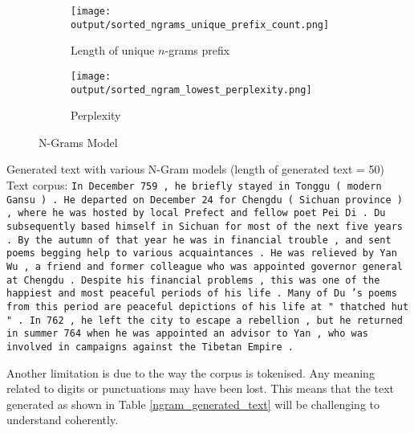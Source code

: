 \begin{figure}[h!]
    \centering
    
    \begin{subfigure}[b]{0.45\textwidth}
        \centering
        \texttt{[image: output/sorted\_ngrams\_unique\_prefix\_count.png]}
        \caption{Length of unique $n$-grams prefix}
        \label{fig:ngram_unique_prefix_count}
    \end{subfigure}
    \hfill
    \begin{subfigure}[b]{0.45\textwidth}
        \centering
        \texttt{[image: output/sorted\_ngram\_lowest\_perplexity.png]}
        \caption{Perplexity}
        \label{fig:ngram_lowest_perplexity}
    \end{subfigure}
    
    \caption{N-Grams Model}
    \label{fig:n-grams}
\end{figure}

\begin{table}[h]
    \centering
    \caption{
        Generated text with various N-Gram models (length of generated text = 50)\\
        Text corpus: \texttt{In December 759 , he briefly stayed in Tonggu ( modern Gansu ) . He departed on December 24 for Chengdu ( Sichuan province ) , where he was hosted by local Prefect and fellow poet Pei Di . Du subsequently based himself in Sichuan for most of the next five years . By the autumn of that year he was in financial trouble , and sent poems begging help to various acquaintances . He was relieved by Yan Wu , a friend and former colleague who was appointed governor general at Chengdu . Despite his financial problems , this was one of the happiest and most peaceful periods of his life . Many of Du 's poems from this period are peaceful depictions of his life at " thatched hut " . In 762 , he left the city to escape a rebellion , but he returned in summer 764 when he was appointed an advisor to Yan , who was involved in campaigns against the Tibetan Empire .}
    }
    \label{ngram_generated_text}
\end{table}

Another limitation is due to the way the corpus is tokenised.
Any meaning related to digits or punctuations may have been lost. 
This means that the text generated as shown in Table \ref{ngram_generated_text} will be challenging to understand coherently.